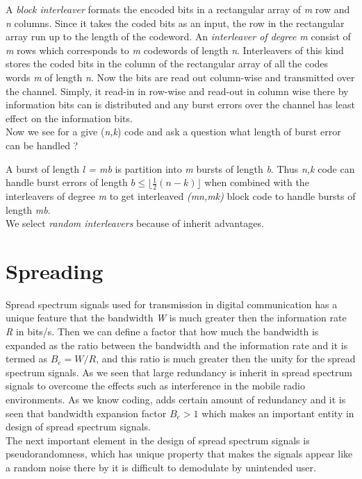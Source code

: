 A \textit{block interleaver} formats the encoded bits in a rectangular array of \textit{m} row and \textit{n} columns. Since it takes the coded bits as an input, the row in the rectangular array run up to the length of the codeword. An \textit{interleaver of degree m} consist of \textit{m} rows which corresponds to \textit{m} codewords of length \textit{n}. Interleavers of this kind stores the coded bits in the column of the rectangular array of all the codes words \textit{m} of length \textit{n}. Now the bits are read out column-wise and transmitted over the channel. Simply, it read-in in row-wise and read-out in column wise there by information bits can is distributed and any burst errors over the channel has least effect on the information bits. \\

Now we see for a give (\textit{n,k}) code and ask a question what length of burst error can be handled ?

A burst of length \textit{l = mb} is partition into \textit{m} bursts of length \textit{b}. Thus \textit{n,k} code can handle burst errors of length $b\leq \lfloor \frac{1}{2}(n-k)\rfloor$ when combined with the interleavers of degree \textit{m} to get interleaved \textit{(mn,mk)} block code to handle bursts of length \textit{mb}. \\

We select \textit{random interleavers} because of inherit advantages.

\section{Spreading}

Spread spectrum signals used for transmission in digital communication has a unique feature that the bandwidth \textit{W} is much greater then the information rate \textit{R} in bits/s. Then we can define a factor that how much the bandwidth is expanded as the ratio between the bandwidth and the information rate and it is termed as $B_e=W/R$, and this ratio is much greater then the unity for the spread spectrum signals. As we seen that large redundancy is inherit in spread spectrum signals to overcome the effects such as interference in the mobile radio environments. As we know 
coding, adds certain amount of redundancy and it is seen that bandwidth expansion factor $B_e > 1$ which makes an important entity in design of spread spectrum signals.\\

The next important element in the design of spread spectrum signals is pseudorandomness, which has unique property that makes the signals appear like a random noise there by it is difficult to demodulate by unintended user. \\

